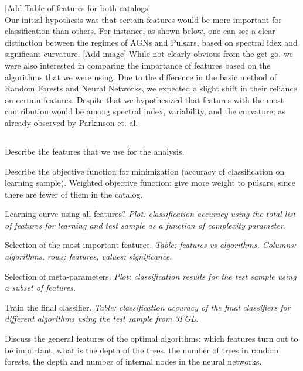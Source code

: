 [Add Table of features for both catalogs]\\

Our initial hypothesis was that certain features would be more important for classification than others. For instance, as shown below, one can see a clear distinction between the regimes of AGNs and Pulsars, based on spectral idex and significant curvature. [Add image] While not clearly obvious from the get go, we were also interested in comparing the importance of features based on the algorithms that we were using. Due to the difference in the basic method of Random Forests and Neural Networks, we expected a slight shift in their reliance on certain features. Despite that we hypothesized that features with the most contribution would be among spectral index, variability, and the curvature; as already observed by Parkinson et. al.\\


\subsection{}


\ben
\item
Describe the features that we use for the analysis.
\item
Describe the objective function for minimization (accuracy of classification on learning sample).
Weighted objective function: give more weight to pulsars, since there are fewer of them in the catalog.
\item
Learning curve using all features?
{\it Plot: classification accuracy using the total list of features for learning and test sample as a function of complexity parameter.}
\item
Selection of the most important features.
{\it Table: features vs algorithms. Columns: algorithms, rows: features, values: significance.}
\item
Selection of meta-parameters.
{\it Plot: classification results for the test sample using a subset of features.}
\item
Train the final classifier.
{\it Table: classification accuracy of the final classifiers for different algorithms using the test sample from 3FGL.}
\een

Discuss the general features of the optimal algorithms: which features turn out to be important, what is the depth of the trees, the number of trees in random forests, the depth and number of internal nodes in the neural networks. 

